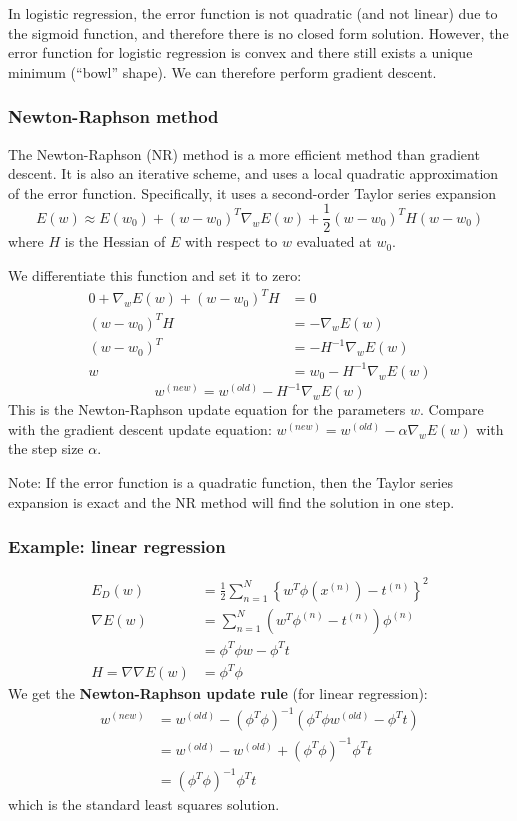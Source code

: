 \documentclass[a4paper,12pt]{article}
\begin{document}
In logistic regression, the error function is not quadratic (and not linear) due to the sigmoid function, and therefore there is no closed form solution. However, the error function for logistic regression is convex and there still exists a unique minimum (``bowl'' shape). We can therefore perform gradient descent. 

\subsubsection{Newton-Raphson method}

The Newton-Raphson (NR) method is a more efficient method than gradient descent. It is also an iterative scheme, and uses a local quadratic approximation of the error function. Specifically, it uses a second-order Taylor series expansion
$$E(w) \approx E(w_0) + (w-w_0)^T \nabla_wE(w) + \frac{1}{2}(w-w_0)^T H(w-w_0)$$
where $H$ is the Hessian of $E$ with respect to $w$ evaluated at $w_0$. 

We differentiate this function and set it to zero: 
\begin{align*}
0 + \nabla_w E(w) + (w-w_0)^T H &= 0\\
(w-w_0)^T H &= -\nabla_w E(w)\\
(w-w_0)^T &= -H^{-1}\nabla_w E(w)\\
w &= w_0 - H^{-1}\nabla_w E(w)
\end{align*}
$$w^{(new)} = w^{(old)} - H^{-1}\nabla_w E(w)$$
This is the Newton-Raphson update equation for the parameters $w$. Compare with the gradient descent update equation: $w^{(new)} = w^{(old)} - \alpha\nabla_w E(w)$ with the step size $\alpha$. 

Note: If the error function is a quadratic function, then the Taylor series expansion is exact and the NR method will find the solution in one step. 

\subsubsection{Example: linear regression}

\begin{align*}
E_D(w) &= \frac{1}{2} \sum_{n=1}^N \left\{w^T\phi(x^{(n)}) - t^{(n)} \right\}^2\\
\nabla E(w) &= \sum_{n=1}^N (w^T\phi^{(n)} - t^{(n)})\phi^{(n)}\\
			&= \phi^T \phi w - \phi^T t \\
H = \nabla \nabla E(w) &= \phi^T \phi
\end{align*}
We get the \textbf{Newton-Raphson update rule} (for linear regression): 
\begin{align*}
w^{(new)} &= w^{(old)} - (\phi^T\phi)^{-1}(\phi^T\phi w^{(old)} - \phi^Tt) \\
&= w^{(old)} - w^{(old)} + (\phi^T\phi)^{-1}\phi^Tt \\
&= (\phi^T\phi)^{-1}\phi^Tt
\end{align*}
which is the standard least squares solution. 
\end{document}
